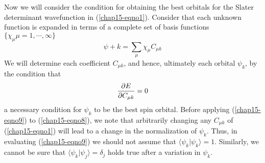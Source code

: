 Now we will consider the condition for obtaining the best orbitals for
the Slater determinant wavefunction in (\ref{chap15-eqno1}).  Consider
that each unknown function is expanded in terms of a complete set of
basis functions $\{
\chi_{\mu} \mu = 1, \cdots , \infty\}$
\begin{equation}
\psi+k = \sum_{\mu} \chi_{\mu} C_{\mu k}
\end{equation}
We will determine each coefficient $C_{\mu k}$, and hence, ultimately 
each orbital $\psi_k$, by the condition that
\begin{equation}
{\partial E \over \partial C_{\mu k}} = 0
\label{chap15-eqno9}
\end{equation}
a necessary condition for $\psi_k$ to be the best spin orbital.
Before applying (\ref{chap15-eqno9}) to (\ref{chap15-eqno8}), we note
that arbitrarily changing any $C_{\mu k}$ of (\ref{chap15-eqno1}) will
lead to a change in the normalization of $\psi_k$.  Thus, in
evaluating (\ref{chap15-eqno9}) we should not assume that
$\langle\psi_k | \psi_k\rangle = 1$.  Similarly, we cannot be sure
that $\langle \psi_k |\psi_j \rangle = \delta_j$ holds true after a
variation in $\psi_k$.  

